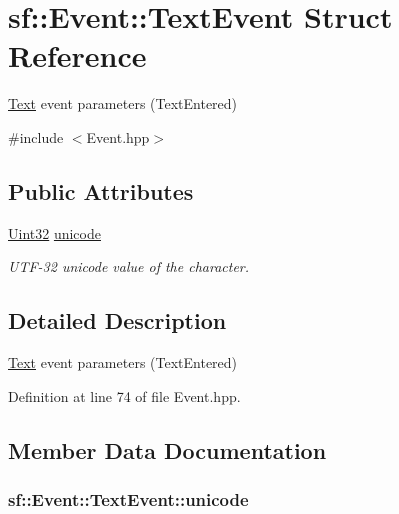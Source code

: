 \hypertarget{structsf_1_1_event_1_1_text_event}{\section{sf\-:\-:Event\-:\-:Text\-Event Struct Reference}
\label{structsf_1_1_event_1_1_text_event}
}


\hyperlink{classsf_1_1_text}{Text} event parameters (Text\-Entered)  




{\ttfamily \#include $<$Event.\-hpp$>$}

\subsection*{Public Attributes}
\begin{DoxyCompactItemize}
\item 
\hyperlink{namespacesf_aa746fb1ddef4410bddf198ebb27e727c}{Uint32} \hyperlink{structsf_1_1_event_1_1_text_event_a00d96b1a5328a1d7cbc276e161befcb0}{unicode}
\begin{DoxyCompactList}\small\item\em U\-T\-F-\/32 unicode value of the character. \end{DoxyCompactList}\end{DoxyCompactItemize}


\subsection{Detailed Description}
\hyperlink{classsf_1_1_text}{Text} event parameters (Text\-Entered) 

Definition at line 74 of file Event.\-hpp.



\subsection{Member Data Documentation}
\hypertarget{structsf_1_1_event_1_1_text_event_a00d96b1a5328a1d7cbc276e161befcb0}{
\subsubsection[{unicode}]{ sf\-::\-Event\-::\-Text\-Event\-::unicode}}\label{structsf_1_1_event_1_1_text_event_a00d96b1a5328a1d7cbc276e161befcb0}


